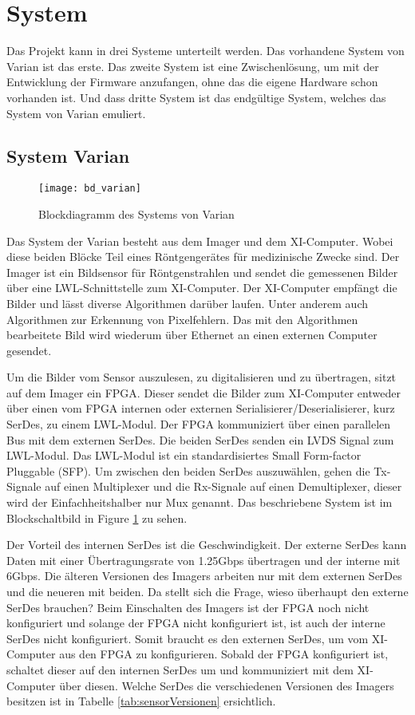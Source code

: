 \section{System}
Das Projekt kann in drei Systeme unterteilt werden. Das vorhandene System von Varian ist das erste. Das zweite System ist eine Zwischenlösung, um mit der Entwicklung der Firmware anzufangen, ohne das die eigene Hardware schon vorhanden ist. Und dass dritte System ist das endgültige System, welches das System von Varian emuliert.

\subsection{System Varian}
\begin{figure}[tb]
    \centering
    \texttt{[image: bd\_varian]}
    \caption{Blockdiagramm des Systems von Varian}
    \label{fig:bd_varian}
\end{figure}

Das System der Varian besteht aus dem Imager und dem XI-Computer. Wobei diese beiden Blöcke Teil eines Röntgengerätes für medizinische Zwecke sind. Der Imager ist ein Bildsensor für Röntgenstrahlen und sendet die gemessenen Bilder über eine LWL-Schnittstelle zum XI-Computer. Der XI-Computer empfängt die Bilder und lässt diverse Algorithmen darüber laufen. Unter anderem auch Algorithmen zur Erkennung von Pixelfehlern. Das mit den Algorithmen bearbeitete Bild wird wiederum über Ethernet an einen externen Computer gesendet.

Um die Bilder vom Sensor auszulesen, zu digitalisieren und zu übertragen, sitzt auf dem Imager ein FPGA. Dieser sendet die Bilder zum XI-Computer ent\-weder über einen vom FPGA internen oder externen Serialisierer/Deserialisierer, kurz SerDes, zu einem LWL-Modul. Der FPGA kommuniziert über einen parallelen Bus mit dem externen SerDes. Die beiden SerDes senden ein LVDS Signal zum LWL-Modul. Das LWL-Modul ist ein standardisiertes Small Form-factor Pluggable (SFP). Um zwischen den beiden SerDes auszuwählen, gehen die Tx-Signale auf einen Multiplexer und die Rx-Signale auf einen Demultiplexer, dieser wird der Einfachheitshalber nur Mux genannt. Das beschriebene System ist im Blockschaltbild in Figure \ref{fig:bd_varian} zu sehen.

Der Vorteil des internen SerDes ist die Geschwindigkeit. Der externe SerDes kann Daten mit einer Übertragungsrate von 1.25Gbps übertragen und der interne mit 6Gbps. Die älteren Versionen des Imagers arbeiten nur mit dem externen SerDes und die neueren mit beiden. Da stellt sich die Frage, wieso überhaupt den externe SerDes brauchen? Beim Einschalten des Imagers ist der FPGA noch nicht konfiguriert und solange der FPGA nicht konfiguriert ist, ist auch der interne SerDes nicht konfiguriert. Somit braucht es den externen SerDes, um vom XI-Computer aus den FPGA zu konfigurieren. Sobald der FPGA konfiguriert ist, schaltet dieser auf den internen SerDes um und kommuniziert mit dem XI-Computer über diesen. Welche SerDes die verschiedenen Versionen des Imagers besitzen ist in Tabelle \ref{tab:sensorVersionen} ersichtlich.

